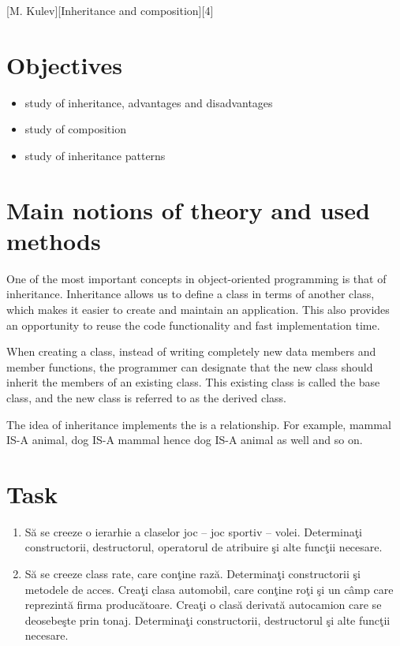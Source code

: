 \documentclass{article}
\begin{document}
	\def \reportSubj{Inheritance and composition}
	[M. Kulev][\reportSubj][4]

	\section{Objectives}
		\begin{itemize}
			\item study of inheritance, advantages and disadvantages
			\item study of composition
			\item study of inheritance patterns
		\end{itemize}

	\section{Main notions of theory and used methods}
		\par One of the most important concepts in object-oriented programming is that of inheritance. Inheritance allows us to define a class in terms of another class, which makes it easier to create and maintain an application. This also provides an opportunity to reuse the code functionality and fast implementation time.

		\par When creating a class, instead of writing completely new data members and member functions, the programmer can designate that the new class should inherit the members of an existing class. This existing class is called the base class, and the new class is referred to as the derived class.

		\par The idea of inheritance implements the is a relationship. For example, mammal IS-A animal, dog IS-A mammal hence dog IS-A animal as well and so on.

	\section{Task}
		\begin{enumerate}
			\item Să se creeze o ierarhie a claselor joc – joc sportiv – volei. Determinaţi constructorii, destructorul, operatorul de atribuire şi alte funcţii necesare.
			\item Să se creeze class rate,  care conţine rază. Determinaţi constructorii şi metodele de acces. Creaţi clasa automobil, care conţine roţi şi un câmp care reprezintă firma producătoare. Creaţi o clasă derivată autocamion care se deosebeşte prin tonaj. Determinaţi constructorii, destructorul şi alte funcţii necesare.
		\end{enumerate}
\end{document}
